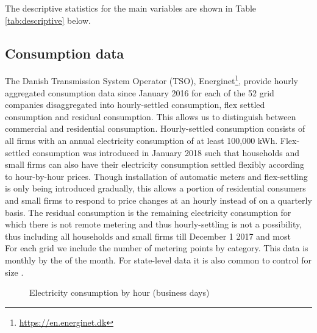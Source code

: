 \label{sec:data}
The descriptive statistics for the main variables are shown in Table \ref{tab:descriptive} below.

\subsection{Consumption data}
\label{subsec:d_consumption}
The Danish Transmission System Operator (TSO), Energinet\footnote{\url{https://en.energinet.dk}}, provide hourly aggregated consumption data since January 2016 for each of the 52 grid companies disaggregated into hourly-settled consumption, flex settled consumption and residual consumption. This allows us to distinguish between commercial and residential consumption. Hourly-settled consumption consists of all firms with an annual electricity consumption of at least 100,000 kWh. Flex-settled consumption was introduced in January 2018 such that households and small firms can also have their electricity consumption settled flexibly according to hour-by-hour prices. Though installation of automatic meters and flex-settling is only being introduced gradually, this allows a portion of residential consumers and small firms to respond to price changes at an hourly instead of on a quarterly basis. The residual consumption is the remaining electricity consumption for which there is not remote metering and thus hourly-settling is not a possibility, thus including all households and small firms till December 1 2017 and most
\medskip\\
For each grid we include the number of metering points by category. This data is monthly by the  of the month. For state-level data it is also common to control for size \citep{burke2017price}.
\begin{figure}[H]
  \centering
  \caption{Electricity consumption by hour (business days)}
  \label{fig:cons_hour}
\end{figure}


